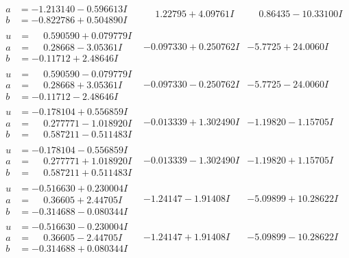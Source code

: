 \documentclass[1p]{elsarticle_modified}
\theoremstyle{definition}
\begin{document}
$$\begin{array}{c|c|c}
\begin{aligned}
a &= -1.213140 - 0.596613 I \\
b &= -0.822786 + 0.504890 I\end{aligned}
 & \phantom{-}1.22795 + 4.09761 I & \phantom{-}0.86435 - 10.33100 I \\ \hline\begin{aligned}
u &= \phantom{-}0.590590 + 0.079779 I \\
a &= \phantom{-}0.28668 - 3.05361 I \\
b &= -0.11712 + 2.48646 I\end{aligned}
 & -0.097330 + 0.250762 I & -5.7725 + 24.0060 I \\ \hline\begin{aligned}
u &= \phantom{-}0.590590 - 0.079779 I \\
a &= \phantom{-}0.28668 + 3.05361 I \\
b &= -0.11712 - 2.48646 I\end{aligned}
 & -0.097330 - 0.250762 I & -5.7725 - 24.0060 I \\ \hline\begin{aligned}
u &= -0.178104 + 0.556859 I \\
a &= \phantom{-}0.277771 - 1.018920 I \\
b &= \phantom{-}0.587211 - 0.511483 I\end{aligned}
 & -0.013339 + 1.302490 I & -1.19820 - 1.15705 I \\ \hline\begin{aligned}
u &= -0.178104 - 0.556859 I \\
a &= \phantom{-}0.277771 + 1.018920 I \\
b &= \phantom{-}0.587211 + 0.511483 I\end{aligned}
 & -0.013339 - 1.302490 I & -1.19820 + 1.15705 I \\ \hline\begin{aligned}
u &= -0.516630 + 0.230004 I \\
a &= \phantom{-}0.36605 + 2.44705 I \\
b &= -0.314688 - 0.080344 I\end{aligned}
 & -1.24147 - 1.91408 I & -5.09899 + 10.28622 I \\ \hline\begin{aligned}
u &= -0.516630 - 0.230004 I \\
a &= \phantom{-}0.36605 - 2.44705 I \\
b &= -0.314688 + 0.080344 I\end{aligned}
 & -1.24147 + 1.91408 I & -5.09899 - 10.28622 I \\ \hline\begin{aligned}

\end{aligned}
\end{array}$$
\end{document}
